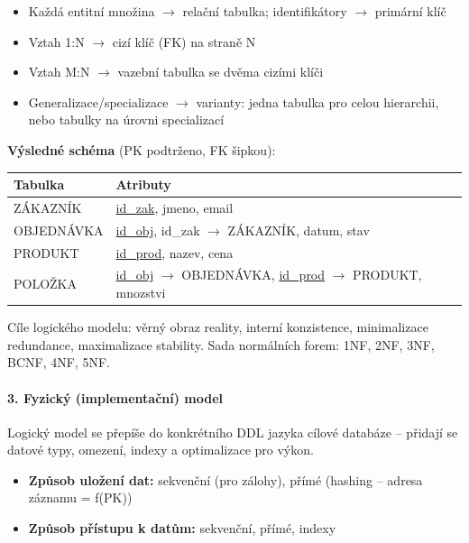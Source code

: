 \begin{itemize}
  \item Každá entitní množina $\to$ relační tabulka; identifikátory $\to$ primární klíč
  \item Vztah 1:N $\to$ cizí klíč (FK) na straně N
  \item Vztah M:N $\to$ vazební tabulka se dvěma cizími klíči
  \item Generalizace/specializace $\to$ varianty: jedna tabulka pro celou hierarchii, nebo tabulky na úrovni specializací
\end{itemize}

\textbf{Výsledné schéma} (PK podtrženo, FK šipkou):

\begin{center}
\begin{tabular}{ll}
\toprule
\textbf{Tabulka} & \textbf{Atributy} \\
\midrule
ZÁKAZNÍK & \underline{id\_zak}, jmeno, email \\
OBJEDNÁVKA & \underline{id\_obj}, id\_zak $\to$ ZÁKAZNÍK, datum, stav \\
PRODUKT & \underline{id\_prod}, nazev, cena \\
POLOŽKA & \underline{id\_obj} $\to$ OBJEDNÁVKA, \underline{id\_prod} $\to$ PRODUKT, mnozstvi \\
\bottomrule
\end{tabular}
\end{center}

Cíle logického modelu: věrný obraz reality, interní konzistence, minimalizace redundance, maximalizace stability.
Sada normálních forem: 1NF, 2NF, 3NF, BCNF, 4NF, 5NF.

\paragraph{3. Fyzický (implementační) model}
Logický model se přepíše do konkrétního DDL jazyka cílové databáze -- přidají se datové typy,
omezení, indexy a optimalizace pro výkon.

\begin{itemize}
  \item \textbf{Způsob uložení dat:} sekvenční (pro zálohy), přímé (hashing -- adresa záznamu = f(PK))
  \item \textbf{Způsob přístupu k datům:} sekvenční, přímé, indexy
\end{itemize}

